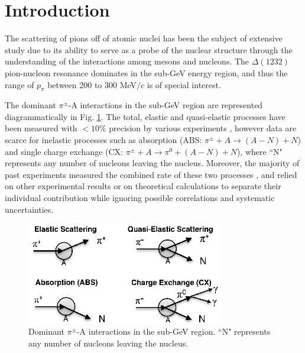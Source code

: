 \section{\label{sec:intro}Introduction\protect}
The scattering of pions off of atomic nuclei has been the subject of extensive study
due to its ability to serve as a probe of the nuclear structure 
through the understanding of the interactions among mesons and nucleons. The $\Delta(1232)$ pion-nucleon resonance dominates in the sub-GeV energy region, and thus the range of $p_{\pi}$ between 200 to 300 MeV$/c$ is of special interest.


The dominant $\pi^{\pm}$-A interactions in the sub-GeV region are represented diagrammatically in Fig. \ref{fig:interactions}. The total, elastic and quasi-elastic processes have been measured with $<10\%$ precision by various experiments \cite{Allardyce,Binon,Saunders,Gelderloos,Levenson,Ashery2,Ingram,Jones,Ashery,Bellotti1973,Bellotti1973_2}, however data are scarce for inelastic processes such as absorption (ABS: $\pi^{\pm}+A\rightarrow (A-N) + N$) and single charge exchange (CX: $\pi^{\pm} + A \rightarrow \pi^{0}+ (A-N) + N$), where ``N" represents any number of nucleons leaving the nucleus. Moreover, the majority of past experiments measured the combined rate of these two processes \cite{gianneli,navon}, and relied on other experimental results or on theoretical calculations to separate their individual contribution while ignoring possible correlations and systematic uncertainties.

\begin{figure}[ht]
\includegraphics[width=86mm]{figures/Figure1_sep_paper_b_w.eps}
\caption{Dominant $\pi^{\pm}$-A interactions in the sub-GeV region. ``N" represents any number of nucleons leaving the nucleus.}
\label{fig:interactions}
\end{figure}

